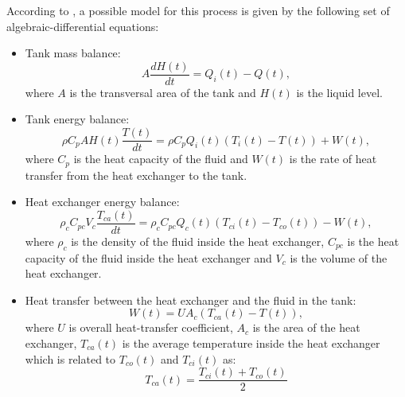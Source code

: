 According to \citet{Alfaro2016}, a possible model for this process is given by the following set of algebraic-differential equations:
\begin{itemize}
	\item Tank mass balance:
			\begin{equation*}
				A \frac{d H(t)}{dt} = Q_i(t) - Q(t),
			\end{equation*}
			where $A$ is the transversal area of the tank and $H(t)$ is the liquid level.
	\item Tank energy balance:
			\begin{equation*}
				\rho C_p A H(t) \frac{T(t)}{dt} = \rho C_p Q_i(t)\left( T_i(t) - T(t)\right) + W(t),
			\end{equation*}
			where $C_p$ is the heat capacity of the fluid and $W(t)$ is the rate of heat transfer from the heat exchanger to the tank. %
	\item Heat exchanger energy balance:
			\begin{equation*}
				\rho_c C_{pc} V_c \frac{T_{ca}(t)}{dt} = \rho_c C_{pc} Q_c(t)\left( T_{ci}(t)-T_{co}(t)\right) - W(t),
			\end{equation*}
			where $\rho_c$ is the density of the fluid inside the heat exchanger, $C_{pc}$ is the heat capacity of the fluid inside the heat exchanger and $V_c$ is the volume of the heat exchanger.
	\item Heat transfer between the heat exchanger and the fluid in the tank:
			\begin{equation*}
				W(t) = U A_c \left( T_{ca}(t) - T(t)\right), 
			\end{equation*}
			where $U$ is overall heat-transfer coefficient, $A_c$ is the area of the heat exchanger, $T_{ca}(t)$ is the average temperature inside the heat exchanger which is related to $T_{co}(t)$ and $T_{ci}(t)$ as:
			\begin{equation*}
				T_{ca}(t) = \frac{T_{ci}(t) + T_{co}(t)}{2}
			\end{equation*}
\end{itemize}

